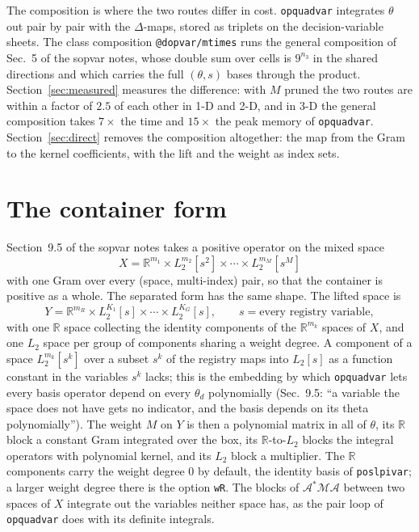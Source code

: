 \documentclass[12pt]{article}
\newcommand{\R}{\mathbb{R}}
\newcommand{\mcl}[1]{\mathcal{#1}}
\newcommand{\code}[1]{\texttt{#1}}
\theoremstyle{plain}
\theoremstyle{definition}
\theoremstyle{remark}
\begin{document}
The composition is where the two routes differ in cost. \code{opquadvar} integrates $\theta$ out pair by pair with the $\Delta$-maps, stored as triplets on the decision-variable sheets. The class composition \code{@dopvar/mtimes} runs the general composition of Sec.~5 of the sopvar notes, whose double sum over cells is $9^{n_3}$ in the shared directions and which carries the full $(\theta,s)$ bases through the product. Section~\ref{sec:measured} measures the difference: with $M$ pruned the two routes are within a factor of $2.5$ of each other in 1-D and 2-D, and in 3-D the general composition takes $7\times$ the time and $15\times$ the peak memory of \code{opquadvar}. Section~\ref{sec:direct} removes the composition altogether: the map from the Gram to the kernel coefficients, with the lift and the weight as index sets.

\section{The container form}\label{sec:container}

Section~9.5 of the sopvar notes takes a positive operator on the mixed space
\[
X=\R^{m_1}\times L_2^{m_2}[s^2]\times\cdots\times L_2^{m_M}[s^M]
\]
with one Gram over every (space, multi-index) pair, so that the container is positive as a whole. The separated form has the same shape. The lifted space is
\begin{equation}\label{eq:Y}
Y=\R^{m_R}\times L_2^{K_1}[s]\times\cdots\times L_2^{K_G}[s],\qquad s=\text{every registry variable},
\end{equation}
with one $\R$ space collecting the identity components of the $\R^{m_k}$ spaces of $X$, and one $L_2$ space per group of components sharing a weight degree. A component of a space $L_2^{m_k}[s^k]$ over a subset $s^k$ of the registry maps into $L_2[s]$ as a function constant in the variables $s^k$ lacks; this is the embedding by which \code{opquadvar} lets every basis operator depend on every $\theta_d$ polynomially (Sec.~9.5: ``a variable the space does not have gets no indicator, and the basis depends on its theta polynomially''). The weight $M$ on $Y$ is then a polynomial matrix in all of $\theta$, its $\R$ block a constant Gram integrated over the box, its $\R$-to-$L_2$ blocks the integral operators with polynomial kernel, and its $L_2$ block a multiplier. The $\R$ components carry the weight degree $0$ by default, the identity basis of \code{poslpivar}; a larger weight degree there is the option \code{wR}. The blocks of $\mcl A^*\mcl M\mcl A$ between two spaces of $X$ integrate out the variables neither space has, as the pair loop of \code{opquadvar} does with its definite integrals.
\end{document}
